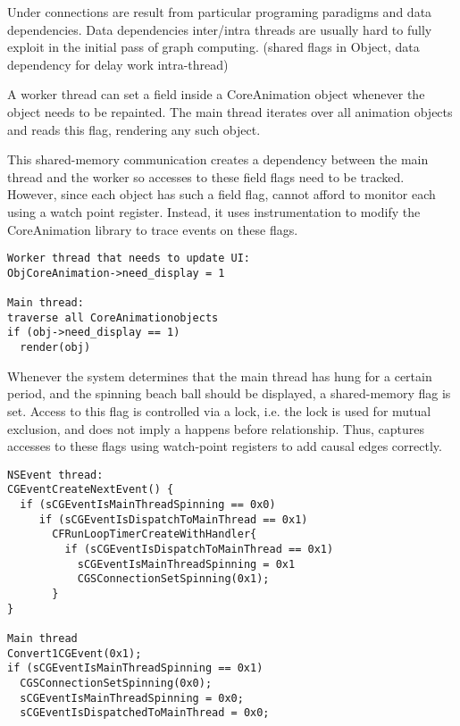 Under connections are result from particular programing paradigms and data
dependencies. Data dependencies inter/intra threads are usually hard to fully
exploit in the initial pass of graph computing. (shared flags in Object, data
dependency for delay work intra-thread)

A worker thread can set a field  inside a CoreAnimation object
whenever the object needs to be repainted. The main thread iterates over all
animation objects and reads this flag, rendering any such object.

This shared-memory communication creates a dependency between the main thread
and the worker so accesses to these field flags need to be tracked. However,
since each object has such a field flag, \xxx cannot afford to monitor each
using a watch point register. Instead, it uses instrumentation to modify the
CoreAnimation library to trace events on these flags.

{\footnotesize \begin{verbatim}
Worker thread that needs to update UI:
ObjCoreAnimation->need_display = 1

Main thread: 
traverse all CoreAnimationobjects
if (obj->need_display == 1)
  render(obj)

\end{verbatim}
}

Whenever the system determines that the main thread has hung for a certain
period, and the spinning beach ball should be displayed, a shared-memory flag
is set. Access to this flag is controlled via a lock, i.e. the lock is used for
mutual exclusion, and does not imply a happens before relationship. Thus, \xxx
captures accesses to these flags using watch-point registers to add causal edges
correctly.

{\footnotesize \begin{verbatim}
NSEvent thread:
CGEventCreateNextEvent() {
  if (sCGEventIsMainThreadSpinning == 0x0)
     if (sCGEventIsDispatchToMainThread == 0x1)
       CFRunLoopTimerCreateWithHandler{
         if (sCGEventIsDispatchToMainThread == 0x1)
           sCGEventIsMainThreadSpinning = 0x1
           CGSConnectionSetSpinning(0x1);
       }
}

Main thread
Convert1CGEvent(0x1);
if (sCGEventIsMainThreadSpinning == 0x1)
  CGSConnectionSetSpinning(0x0);
  sCGEventIsMainThreadSpinning = 0x0;
  sCGEventIsDispatchedToMainThread = 0x0;
\end{verbatim}
}

